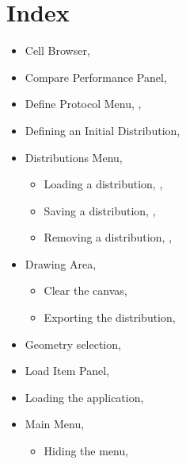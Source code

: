 \chapter{Index}
\begin{itemize}
  \item Cell Browser, \pageref{sec:cellBrows}
  \item Compare Performance Panel, \pageref{sec:compareperf}
  \item Define Protocol Menu, \pageref{sec:defprot}, \pageref{sec:defineMixProt}
  \item Defining an Initial Distribution, \pageref{sec:defineDist}
  \item Distributions Menu, \pageref{sec:distmenu}
  \begin{itemize}
    \item Loading a distribution, \pageref{sec:distmenu}, \pageref{sec:loadDist}
    \item Saving a distribution, \pageref{sec:distmenu}, \pageref{sec:savdist}
    \item Removing a distribution, \pageref{sec:distmenu}, \pageref{sec:remdist}
  \end{itemize}

  \item Drawing Area, \pageref{sec:drawingarea}
  \begin{itemize}
    \item Clear the canvas, \pageref{sec:defineDist}
    \item Exporting the distribution, \pageref{sec:exportDist}
  \end{itemize}

  \item Geometry selection, \pageref{sec:ChooseGeomAndMixer}
  \item Load Item Panel, \pageref{sec:loaditempanel}
  \item Loading the application, \pageref{sec:ChooseGeomAndMixer} 
  \item Main Menu, \pageref{sec:mainmenu}
  \begin{itemize}
    \item Hiding the menu, \pageref{sec:defineDist}
  \end{itemize}


\end{itemize}
